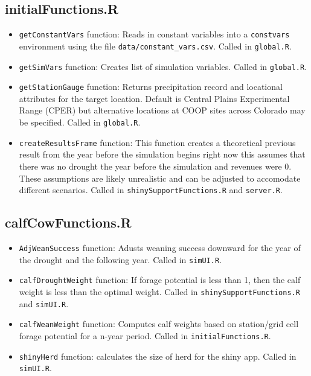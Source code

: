\documentclass[11pt]{article}
\begin{document}
\subsection{initialFunctions.R}

\begin{itemize}
	\item \verb!getConstantVars! function: Reads in constant variables into a
  \verb!constvars! environment using the  file \verb!data/constant_vars.csv!. Called in \verb!global.R!.
  	\item \verb!getSimVars! function: Creates list of simulation variables. Called in \verb!global.R!.
  	\item \verb!getStationGauge! function: Returns precipitation record and locational attributes for the target location. Default is Central Plains Experimental Range (CPER) but alternative locations at COOP sites across Colorado may be specified. Called in \verb!global.R!.
  	\item \verb!createResultsFrame! function: This function creates a theoretical previous result from the year before the simulation begins right now this assumes that there was no drought the year before the simulation and revenues were 0. These assumptions are likely unrealistic and can be adjusted to accomodate different scenarios. Called in \verb!shinySupportFunctions.R! and \verb!server.R!.
\end{itemize}

\subsection{calfCowFunctions.R}

\begin{itemize}
	\item \verb!AdjWeanSuccess! function: Adusts weaning success downward for the year of the drought and the following year. Called in \verb!simUI.R!.
	\item \verb!calfDroughtWeight! function: If forage potential is less than 1, then the calf weight is less than the optimal weight. Called in \verb!shinySupportFunctions.R! and \verb!simUI.R!.
	\item \verb!calfWeanWeight! function: Computes calf weights based on station/grid cell forage potential for a n-year period. Called in \verb!initialFunctions.R!.
	\item \verb!shinyHerd! function: calculates the size of herd for the shiny app. Called in \verb!simUI.R!.
\end{itemize}
\end{document}
